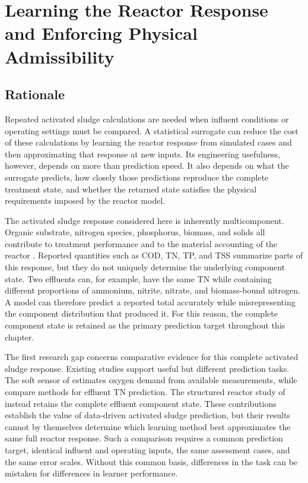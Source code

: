 \chapter{Learning the Reactor Response and Enforcing Physical Admissibility}
\label{ch:projection}

\section{Rationale}

Repeated activated sludge calculations are needed when influent conditions or operating settings must be compared. A statistical surrogate can reduce the cost of these calculations by learning the reactor response from simulated cases and then approximating that response at new inputs. Its engineering usefulness, however, depends on more than prediction speed. It also depends on what the surrogate predicts, how closely those predictions reproduce the complete treatment state, and whether the returned state satisfies the physical requirements imposed by the reactor model.

The activated sludge response considered here is inherently multicomponent. Organic substrate, nitrogen species, phosphorus, biomass, and solids all contribute to treatment performance and to the material accounting of the reactor \citep{Henze2006}. Reported quantities such as COD, TN, TP, and TSS summarize parts of this response, but they do not uniquely determine the underlying component state. Two effluents can, for example, have the same TN while containing different proportions of ammonium, nitrite, nitrate, and biomass-bound nitrogen. A model can therefore predict a reported total accurately while misrepresenting the component distribution that produced it. For this reason, the complete component state is retained as the primary prediction target throughout this chapter.

The first research gap concerns comparative evidence for this complete activated sludge response. Existing studies support useful but different prediction tasks. The soft sensor of \citet{Ching2022} estimates oxygen demand from available measurements, while \citet{Wang2025} compare methods for effluent TN prediction. The structured reactor study of \citet{Selerio2026} instead retains the complete effluent component state. These contributions establish the value of data-driven activated sludge prediction, but their results cannot by themselves determine which learning method best approximates the same full reactor response. Such a comparison requires a common prediction target, identical influent and operating inputs, the same assessment cases, and the same error scales. Without this common basis, differences in the task can be mistaken for differences in learner performance.

